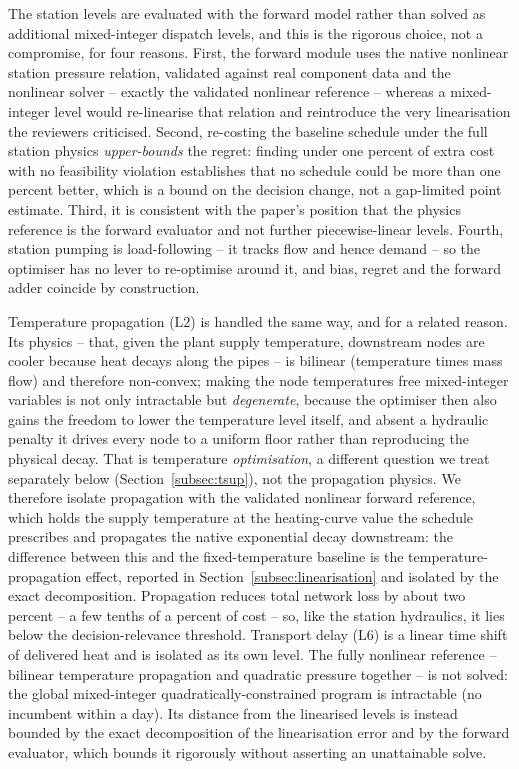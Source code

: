 \documentclass[a4paper,fleqn]{cas-dc}
\newcommand{\Ltwo}{\ensuremath{\mathrm{L2}}}    %
\newcommand{\Lsix}{\ensuremath{\mathrm{L6}}}    %
\begin{document}
The station levels are evaluated with the forward model rather than solved as additional
mixed-integer dispatch levels, and this is the rigorous choice, not a compromise, for four
reasons. First, the forward module uses the native nonlinear station pressure relation,
validated against real component data and the nonlinear solver -- exactly the validated
nonlinear reference -- whereas a mixed-integer level would re-linearise
that relation and reintroduce the very linearisation the reviewers criticised. Second,
re-costing the baseline schedule under the full station physics \emph{upper-bounds} the regret:
finding under one percent of extra cost with no feasibility violation establishes that no schedule
could be more than one percent better, which is a bound on the decision change, not a
gap-limited point estimate. Third, it is consistent with the paper's position that the physics
reference is the forward evaluator and not further piecewise-linear levels. Fourth, station
pumping is load-following -- it tracks flow and hence demand -- so the optimiser has no lever to
re-optimise around it, and bias, regret and the forward adder coincide by construction.

Temperature propagation ($\Ltwo$) is handled the same way, and for a related reason. Its physics
-- that, given the plant supply temperature, downstream nodes are cooler because heat decays
along the pipes -- is bilinear (temperature times mass flow) and therefore non-convex; making the
node temperatures free mixed-integer variables is not only intractable but \emph{degenerate},
because the optimiser then also gains the freedom to lower the temperature level itself, and
absent a hydraulic penalty it drives every node to a uniform floor rather than reproducing the
physical decay. That is temperature \emph{optimisation}, a different question we treat separately
below (Section~\ref{subsec:tsup}), not the propagation physics. We therefore isolate propagation
with the validated nonlinear forward reference, which holds the supply temperature at the
heating-curve value the schedule prescribes and propagates the native exponential decay
downstream: the difference between this and the fixed-temperature baseline is the
temperature-propagation effect, reported in Section~\ref{subsec:linearisation} and isolated by
the exact decomposition. Propagation reduces total network loss by about two percent -- a few
tenths of a percent of cost -- so, like the station hydraulics, it lies below the
decision-relevance threshold.
Transport delay ($\Lsix$) is a linear time shift of delivered heat and is isolated as its own
level. The fully nonlinear reference -- bilinear temperature propagation and quadratic
pressure together -- is not solved: the global mixed-integer quadratically-constrained program
is intractable (no incumbent within a day). Its distance from the linearised levels is instead
bounded by the exact decomposition of the linearisation error and by the forward evaluator,
which bounds it rigorously without asserting an unattainable solve.
\end{document}
